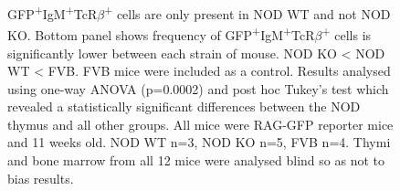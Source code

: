 \begin{figure}
{GFP\textsuperscript{+}IgM\textsuperscript{+}TcR$\beta$\textsuperscript{+} cells are only present in NOD WT and not NOD KO.
Bottom panel shows frequency of GFP\textsuperscript{+}IgM\textsuperscript{+}TcR$\beta$\textsuperscript{+} cells is significantly lower between each strain of mouse. NOD KO < NOD WT < FVB. FVB mice were included as a control.
Results analysed using one-way ANOVA (p=0.0002) and post hoc Tukey's test which revealed a statistically significant differences between the NOD thymus and all other groups.
All mice were RAG-GFP reporter mice and 11 weeks old. NOD WT n=3, NOD KO n=5, FVB n=4.
Thymi and bone marrow from all 12 mice were analysed blind so as not to bias results.}
\label{fig:RAGIgMTcRpos}
\end{figure}














